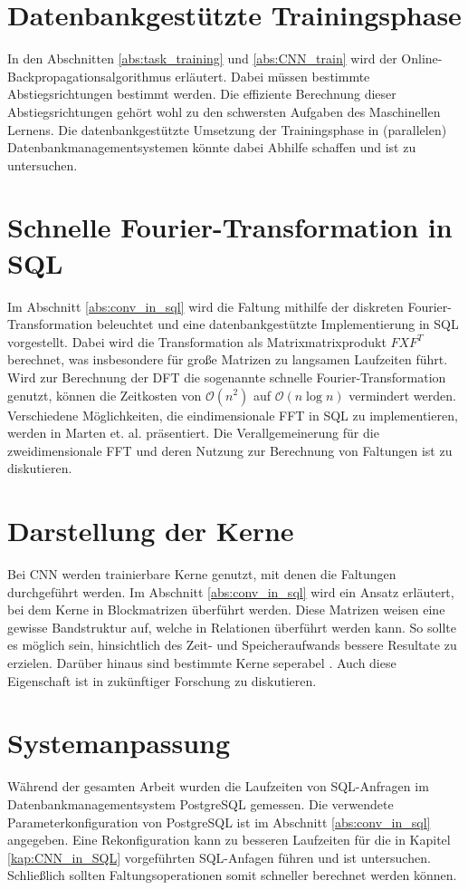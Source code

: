 \section*{Datenbankgestützte Trainingsphase}
In den Abschnitten \ref{abs:task_training} und \ref{abs:CNN_train} wird der Online-Backpropagationsalgorithmus erläutert. Dabei müssen bestimmte Abstiegsrichtungen bestimmt werden. Die effiziente Berechnung dieser Abstiegsrichtungen gehört wohl zu den schwersten Aufgaben des Maschinellen Lernens. Die datenbankgestützte Umsetzung der Trainingsphase in (parallelen) Datenbankmanagementsystemen könnte dabei Abhilfe schaffen und ist zu untersuchen. 

\section*{Schnelle Fourier-Transformation in SQL}
Im Abschnitt \ref{abs:conv_in_sql} wird die Faltung mithilfe der diskreten Fourier-Transformation beleuchtet und eine datenbankgestützte Implementierung in SQL vorgestellt. Dabei wird die Transformation als Matrixmatrixprodukt $F X F^T$ berechnet, was insbesondere für große Matrizen zu langsamen Laufzeiten führt. Wird zur Berechnung der DFT die sogenannte schnelle Fourier-Transformation genutzt, können die Zeitkosten von $\mathcal{O}(n^2)$ auf $\mathcal{O}(n \log n)$ vermindert werden. Verschiedene Möglichkeiten, die eindimensionale FFT in SQL zu implementieren, werden in Marten et. al.\cite{DBLP:conf/adbis/Marten0019} präsentiert. Die Verallgemeinerung für die zweidimensionale FFT und deren Nutzung zur Berechnung von Faltungen ist zu diskutieren.

\section*{Darstellung der Kerne}
Bei CNN werden trainierbare Kerne genutzt, mit denen die Faltungen durchgeführt werden. Im Abschnitt \ref{abs:conv_in_sql} wird ein Ansatz erläutert, bei dem Kerne in Blockmatrizen überführt werden. Diese Matrizen weisen eine gewisse Bandstruktur auf, welche in Relationen überführt werden kann. So sollte es möglich sein, hinsichtlich des Zeit- und Speicheraufwands bessere Resultate zu erzielen. Darüber hinaus sind bestimmte Kerne seperabel \cite{DBLP:journals/tcas/BaiZH18}. Auch diese Eigenschaft ist in zukünftiger Forschung zu diskutieren.

\section*{Systemanpassung}
Während der gesamten Arbeit wurden die Laufzeiten von SQL-Anfragen im Datenbankmanagementsystem PostgreSQL gemessen. Die verwendete Parameterkonfiguration von PostgreSQL ist im Abschnitt \ref{abs:conv_in_sql} angegeben. Eine Rekonfiguration kann zu besseren Laufzeiten für die in Kapitel \ref{kap:CNN_in_SQL} vorgeführten SQL-Anfagen führen und ist untersuchen. Schließlich sollten Faltungsoperationen somit schneller berechnet werden können.